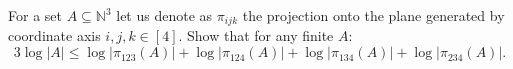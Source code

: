 For a set $A \subseteq \mathbb{N}^3$ let us denote as $\pi_{ijk}$ the projection onto the plane
generated by coordinate axis $i, j, k \in [4]$. Show that for any finite $A$:
$$
    3 \log |A| \le \log |\pi_{123}(A)| + \log |\pi_{124}(A)| + \log |\pi_{134}(A)| + \log
    |\pi_{234}(A)|.
$$